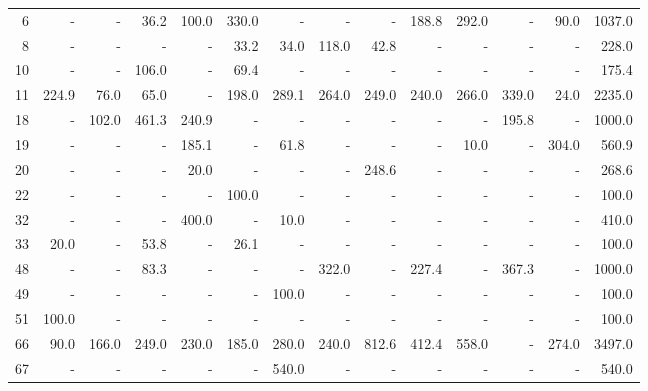 \begin{scriptsize}
\begin{longtable}[c]{r|*{6}{r@{/}r}|r}
\hline
   6&       -&        -&     36.2&    100.0&    330.0&        -&        -&        -&    188.8&    292.0&        -&     90.0&          1037.0\\
   8&       -&        -&        -&        -&     33.2&     34.0&    118.0&     42.8&        -&        -&        -&        -&           228.0\\
  10&       -&        -&    106.0&        -&     69.4&        -&        -&        -&        -&        -&        -&        -&           175.4\\
  11&   224.9&     76.0&     65.0&        -&    198.0&    289.1&    264.0&    249.0&    240.0&    266.0&    339.0&     24.0&          2235.0\\
  18&       -&    102.0&    461.3&    240.9&        -&        -&        -&        -&        -&        -&    195.8&        -&          1000.0\\
  19&       -&        -&        -&    185.1&        -&     61.8&        -&        -&        -&     10.0&        -&    304.0&           560.9\\
  20&       -&        -&        -&     20.0&        -&        -&        -&    248.6&        -&        -&        -&        -&           268.6\\
  22&       -&        -&        -&        -&    100.0&        -&        -&        -&        -&        -&        -&        -&           100.0\\
  32&       -&        -&        -&    400.0&        -&     10.0&        -&        -&        -&        -&        -&        -&           410.0\\
  33&    20.0&        -&     53.8&        -&     26.1&        -&        -&        -&        -&        -&        -&        -&           100.0\\
  48&       -&        -&     83.3&        -&        -&        -&    322.0&        -&    227.4&        -&    367.3&        -&          1000.0\\
  49&       -&        -&        -&        -&        -&    100.0&        -&        -&        -&        -&        -&        -&           100.0\\
  51&   100.0&        -&        -&        -&        -&        -&        -&        -&        -&        -&        -&        -&           100.0\\
  66&    90.0&    166.0&    249.0&    230.0&    185.0&    280.0&    240.0&    812.6&    412.4&    558.0&        -&    274.0&          3497.0\\
  67&       -&        -&        -&        -&        -&    540.0&        -&        -&        -&        -&        -&        -&           540.0\\

\end{longtable}
\end{scriptsize}
